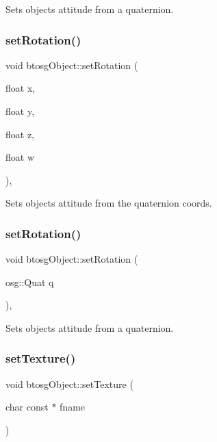 Sets objects attitude from a quaternion. \mbox{\label{classbtosgObject_a4d21ca59b944fd26644db35d3e9ba67a}} 
\subsubsection{\texorpdfstring{set\+Rotation()}{setRotation()}\hspace{0.1cm}{\footnotesize\ttfamily [2/3]}}
{\footnotesize\ttfamily void btosg\+Object\+::set\+Rotation (\begin{DoxyParamCaption}\item[{float}]{x,  }\item[{float}]{y,  }\item[{float}]{z,  }\item[{float}]{w }\end{DoxyParamCaption})\hspace{0.3cm}{\ttfamily [inline]}, {\ttfamily [inherited]}}

Sets objects attitude from the quaternion coords. \mbox{\label{classbtosgObject_ae803e0566f0d7b3ffca686b968b297f8}} 
\subsubsection{\texorpdfstring{set\+Rotation()}{setRotation()}\hspace{0.1cm}{\footnotesize\ttfamily [3/3]}}
{\footnotesize\ttfamily void btosg\+Object\+::set\+Rotation (\begin{DoxyParamCaption}\item[{osg\+::\+Quat}]{q }\end{DoxyParamCaption})\hspace{0.3cm}{\ttfamily [inline]}, {\ttfamily [inherited]}}

Sets objects attitude from a quaternion. \mbox{\label{classbtosgObject_aff54acbc7c66811efb0cf2838107a241}} 
\subsubsection{\texorpdfstring{set\+Texture()}{setTexture()}}
{\footnotesize\ttfamily void btosg\+Object\+::set\+Texture (\begin{DoxyParamCaption}\item[{char const $\ast$}]{fname }\end{DoxyParamCaption})\hspace{0.3cm}{\ttfamily [inherited]}}

